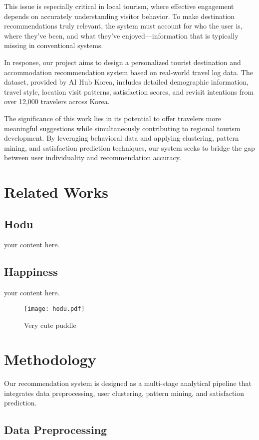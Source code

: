 \documentclass[sigconf]{acmart}
\begin{document}
This issue is especially critical in local tourism, where effective engagement depends on accurately understanding visitor behavior. To make destination recommendations truly relevant, the system must account for who the user is, where they’ve been, and what they’ve enjoyed—information that is typically missing in conventional systems.

In response, our project aims to design a personalized tourist destination and accommodation recommendation system based on real-world travel log data. The dataset, provided by AI Hub Korea, includes detailed demographic information, travel style, location visit patterns, satisfaction scores, and revisit intentions from over 12,000 travelers across Korea.

The significance of this work lies in its potential to offer travelers more meaningful suggestions while simultaneously contributing to regional tourism development. By leveraging behavioral data and applying clustering, pattern mining, and satisfaction prediction techniques, our system seeks to bridge the gap between user individuality and recommendation accuracy.



\section{Related Works}
\subsection{Hodu}
your content here.
\subsection{Happiness}
your content here.
 \begin{figure}[h]
  \centering
  \texttt{[image: hodu.pdf]}
  \caption{Very cute puddle}
  \label{fig:baby puddle}
 \end{figure}

\section{Methodology}

Our recommendation system is designed as a multi-stage analytical pipeline that integrates data preprocessing, user clustering, pattern mining, and satisfaction prediction.

\subsection{Data Preprocessing}
\end{document}

